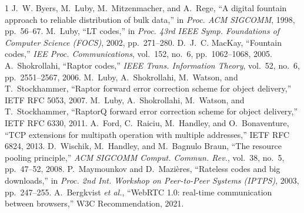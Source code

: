 \documentclass[conference]{IEEEtran}
\begin{document}
\begin{thebibliography}{1}
J.~W. Byers, M.~Luby, M.~Mitzenmacher, and A.~Rege, ``A digital fountain approach
to reliable distribution of bulk data,'' in \emph{Proc. ACM SIGCOMM}, 1998,
pp.~56--67.
M.~Luby, ``LT codes,'' in \emph{Proc. 43rd IEEE Symp. Foundations of Computer
Science (FOCS)}, 2002, pp.~271--280.
D.~J.~C. MacKay, ``Fountain codes,'' \emph{IEE Proc. Communications},
vol.~152, no.~6, pp.~1062--1068, 2005.
A.~Shokrollahi, ``Raptor codes,'' \emph{IEEE Trans. Information Theory},
vol.~52, no.~6, pp.~2551--2567, 2006.
M.~Luby, A.~Shokrollahi, M.~Watson, and T.~Stockhammer, ``Raptor forward error
correction scheme for object delivery,'' IETF RFC 5053, 2007.
M.~Luby, A.~Shokrollahi, M.~Watson, and T.~Stockhammer, ``RaptorQ forward error
correction scheme for object delivery,'' IETF RFC 6330, 2011.
A.~Ford, C.~Raiciu, M.~Handley, and O.~Bonaventure, ``TCP extensions for
multipath operation with multiple addresses,'' IETF RFC 6824, 2013.
D.~Wischik, M.~Handley, and M.~Bagnulo Braun, ``The resource pooling
principle,'' \emph{ACM SIGCOMM Comput. Commun. Rev.}, vol.~38, no.~5,
pp.~47--52, 2008.
P.~Maymounkov and D.~Mazi{\`e}res, ``Rateless codes and big downloads,'' in
\emph{Proc. 2nd Int. Workshop on Peer-to-Peer Systems (IPTPS)}, 2003,
pp.~247--255.
A.~Bergkvist \emph{et al.}, ``WebRTC 1.0: real-time communication between
browsers,'' W3C Recommendation, 2021.
\end{thebibliography}
\end{document}
